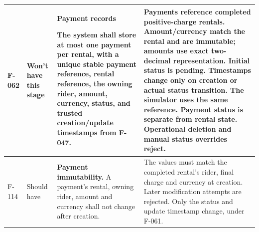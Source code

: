 \documentclass[10pt,a4paper,landscape]{article}
\newcommand{\reqtitle}[1]{{\fontsize{11}{13}\selectfont\bfseries #1}\par\nobreak\vspace{2pt}\noindent}
\begin{document}
\begin{longtable}{|C{27mm}|C{25mm}|L{79mm}|L{111mm}|}
\textbf{F-062} & Won't have this stage & \reqtitle{Payment records}The system shall store at most one payment per rental, with a unique stable payment reference, rental reference, the owning rider, amount, currency, status, and trusted creation/update timestamps from F-047. & Payments reference completed positive-charge rentals. Amount/currency match the rental and are immutable; amounts use exact two-decimal representation. Initial status is pending. Timestamps change only on creation or actual status transition. The simulator uses the same reference. Payment status is separate from rental state. Operational deletion and manual status overrides reject. \\\hline

F-114 & Should have & \textbf{Payment immutability.} A payment's rental, owning rider, amount and currency shall not change after creation. & The values must match the completed rental's rider, final charge and currency at creation. Later modification attempts are rejected. Only the status and update timestamp change, under F-061. \\ \hline
\end{longtable}
\endgroup

\end{document}
